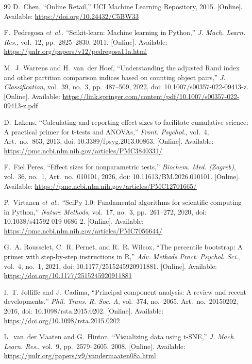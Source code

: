 \documentclass[conference,10pt]{IEEEtran}
\begin{document}
\begin{thebibliography}{99}
D.~Chen, ``Online Retail,'' UCI Machine Learning Repository, 2015.
[Online]. Available: \url{https://doi.org/10.24432/C5BW33}

F.~Pedregosa \emph{et~al.}, ``Scikit-learn: Machine learning in Python,''
\emph{J. Mach. Learn. Res.}, vol.~12, pp.~2825--2830, 2011. [Online].
Available: \url{https://jmlr.org/papers/v12/pedregosa11a.html}

M.~J. Warrens and H.~van~der Hoef, ``Understanding the adjusted Rand index and
other partition comparison indices based on counting object pairs,''
\emph{J. Classification}, vol.~39, no.~3, pp.~487--509, 2022,
doi: 10.1007/s00357-022-09413-z. [Online]. Available:
\url{https://link.springer.com/content/pdf/10.1007/s00357-022-09413-z.pdf}

D.~Lakens, ``Calculating and reporting effect sizes to facilitate cumulative
science: A practical primer for t-tests and ANOVAs,'' \emph{Front. Psychol.},
vol.~4, Art.~no.~863, 2013, doi: 10.3389/fpsyg.2013.00863. [Online].
Available: \url{https://pmc.ncbi.nlm.nih.gov/articles/PMC3840331/}

F.~Fiel Peres, ``Effect sizes for nonparametric tests,'' \emph{Biochem.
Med. (Zagreb)}, vol.~36, no.~1, Art.~no.~010101, 2026,
doi: 10.11613/BM.2026.010101. [Online]. Available:
\url{https://pmc.ncbi.nlm.nih.gov/articles/PMC12701665/}

P.~Virtanen \emph{et~al.}, ``SciPy 1.0: Fundamental algorithms for scientific
computing in Python,'' \emph{Nature Methods}, vol.~17, no.~3, pp.~261--272,
2020, doi: 10.1038/s41592-019-0686-2. [Online]. Available:
\url{https://pmc.ncbi.nlm.nih.gov/articles/PMC7056644/}

G.~A. Rousselet, C.~R. Pernet, and R.~R. Wilcox, ``The percentile bootstrap:
A primer with step-by-step instructions in R,'' \emph{Adv. Methods Pract.
Psychol. Sci.}, vol.~4, no.~1, 2021, doi: 10.1177/2515245920911881.
[Online]. Available: \url{https://doi.org/10.1177/2515245920911881}

I.~T. Jolliffe and J.~Cadima, ``Principal component analysis: A review and
recent developments,'' \emph{Phil. Trans. R. Soc. A}, vol.~374, no.~2065,
Art.~no.~20150202, 2016, doi: 10.1098/rsta.2015.0202. [Online]. Available:
\url{https://doi.org/10.1098/rsta.2015.0202}

L.~van~der Maaten and G.~Hinton, ``Visualizing data using t-SNE,''
\emph{J. Mach. Learn. Res.}, vol.~9, pp.~2579--2605, 2008. [Online].
Available: \url{https://jmlr.org/papers/v9/vandermaaten08a.html}

\end{thebibliography}
\end{document}
